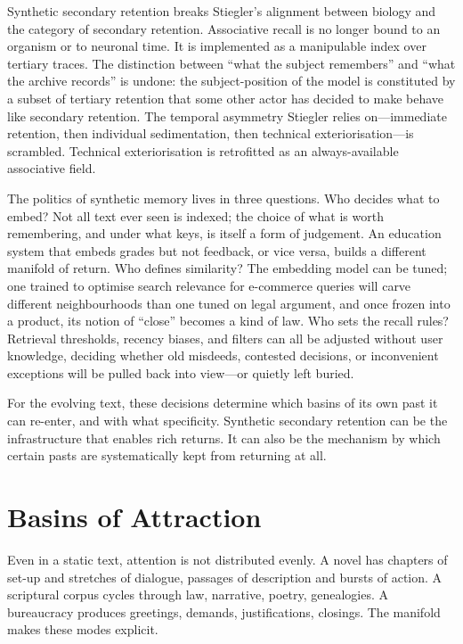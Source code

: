 \documentclass[12pt,a4paper]{report}
\begin{document}
Synthetic secondary retention breaks Stiegler's alignment between biology and the category of secondary retention. Associative recall is no longer bound to an organism or to neuronal time. It is implemented as a manipulable index over tertiary traces. The distinction between ``what the subject remembers'' and ``what the archive records'' is undone: the subject-position of the model is constituted by a subset of tertiary retention that some other actor has decided to make behave like secondary retention. The temporal asymmetry Stiegler relies on---immediate retention, then individual sedimentation, then technical exteriorisation---is scrambled. Technical exteriorisation is retrofitted as an always-available associative field.

The politics of synthetic memory lives in three questions. Who decides what to embed? Not all text ever seen is indexed; the choice of what is worth remembering, and under what keys, is itself a form of judgement. An education system that embeds grades but not feedback, or vice versa, builds a different manifold of return. Who defines similarity? The embedding model can be tuned; one trained to optimise search relevance for e-commerce queries will carve different neighbourhoods than one tuned on legal argument, and once frozen into a product, its notion of ``close'' becomes a kind of law. Who sets the recall rules? Retrieval thresholds, recency biases, and filters can all be adjusted without user knowledge, deciding whether old misdeeds, contested decisions, or inconvenient exceptions will be pulled back into view---or quietly left buried.

For the evolving text, these decisions determine which basins of its own past it can re-enter, and with what specificity. Synthetic secondary retention can be the infrastructure that enables rich returns. It can also be the mechanism by which certain pasts are systematically kept from returning at all.

\section{Basins of Attraction}

Even in a static text, attention is not distributed evenly. A novel has chapters of set-up and stretches of dialogue, passages of description and bursts of action. A scriptural corpus cycles through law, narrative, poetry, genealogies. A bureaucracy produces greetings, demands, justifications, closings. The manifold makes these modes explicit.
\end{document}
